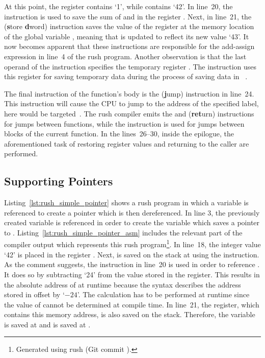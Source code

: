 At this point, the register  contains `1', while  contains `42'.
In line~20, the  instruction is used to save the sum of  and  in the register .
Next, in line~21, the  (\textbf{s}tore \textbf{d}word) instruction saves the value of the register  at the memory location of the global variable ,
meaning that  is updated to reflect its new value `43'.
It now becomes apparent that these instructions are responsible for the add-assign expression in line~4 of the rush program.
Another observation is that the last operand of the  instruction specifies the temporary register .
The instruction uses this register for saving temporary data during the process of saving data in ~\cite[Reference Card]{Patterson2017}.

The final instruction of the  function's body is the  (\textbf{j}ump) instruction in line~24.
This instruction will cause the CPU to jump to the address of the specified label,
here  would be targeted~\cite[p.~17]{Patterson2017}.
The rush compiler emits the  and  (\textbf{ret}urn) instructions for jumps between functions,
while the  instruction is used for jumps between blocks of the current function.
In the lines~26--30, inside the epilogue, the aforementioned task of restoring register values and returning to the caller are performed.

\subsection{Supporting Pointers}

Listing~\ref{lst:rush_simple_pointer} shows a rush program in which a variable is referenced to create a pointer which is then dereferenced.
In line 3, the previously created variable  is referenced in order to create the variable  which saves a pointer to .
Listing~\ref{lst:rush_simple_pointer_asm} includes the relevant part of the compiler output which represents this rush program\footnote{Generated using rush (Git commit \rushCommit{}).}.
In line~18, the integer value `42' is placed in the register .
Next,  is saved on the stack at  using the  instruction.
As the comment suggests, the instruction in line~20 is used in order to reference .
It does so by subtracting `24' from the value stored in the  register.
This results in the absolute address of  at runtime because the syntax  describes the address stored in  offset by `$-24$'.
The calculation has to be performed at runtime since the value of  cannot be determined at compile time.
In line~21, the  register, which contains this memory address, is also saved on the stack.
Therefore, the  variable is saved at  and  is saved at .

